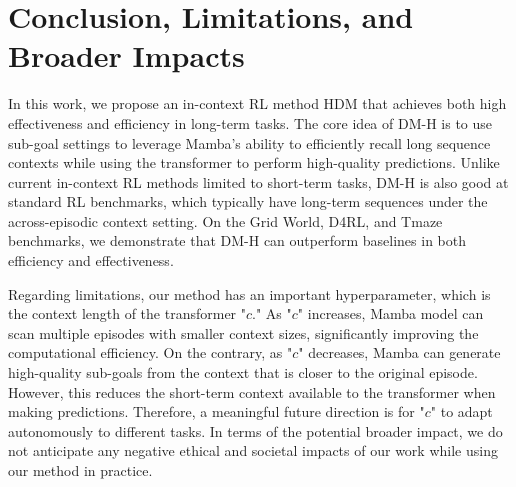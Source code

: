 \section{Conclusion, Limitations, and Broader Impacts}
\label{limitation}
In this work, we propose an in-context RL method HDM that achieves both high effectiveness and efficiency in long-term tasks. The core idea of DM-H is to use sub-goal settings to leverage Mamba's ability to efficiently recall long sequence contexts while using the transformer to perform high-quality predictions. Unlike current in-context RL methods limited to short-term tasks, DM-H is also good at standard RL benchmarks, which typically have long-term sequences under the across-episodic context setting. On the Grid World, D4RL, and Tmaze benchmarks, we demonstrate that DM-H can outperform baselines in both efficiency and effectiveness.

Regarding limitations, our method has an important hyperparameter, which is the context length of the transformer "$c$." As "$c$" increases, Mamba model can scan multiple episodes with smaller context sizes, significantly improving the computational efficiency. On the contrary, as "$c$" decreases, Mamba can generate high-quality sub-goals from the context that is closer to the original episode. However, this reduces the short-term context available to the transformer when making predictions. Therefore, a meaningful future direction is for "$c$" to adapt autonomously to different tasks. In terms of the potential broader impact, we do not anticipate any negative ethical and societal impacts of our work while using our method in practice.